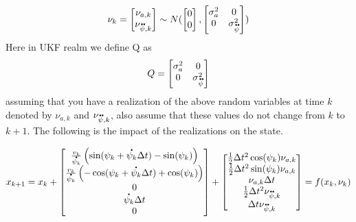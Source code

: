 \documentclass[a4paper,12pt]{article}
\newcommand*{\dt}[1]{%
  \accentset{\mbox{\large\bfseries .}}{#1}}
\newcommand*{\ddt}[1]{%
  \accentset{\mbox{\large\bfseries .\hspace{-0.25ex}.}}{#1}}
\begin{document}
   \begin{align}  
  \nu_{k}=
  		 \begin{bmatrix}
         \nu_{a,k}\\
         \nu_{\ddt{\psi},k}\\
         \end{bmatrix} 
         \sim N(
         \begin{bmatrix}
          0  \\
          0  \\
		 \end{bmatrix},     
         \begin{bmatrix}
    \sigma^2_a       & 0  \\
    0       & \sigma^{2}_{\ddt{\psi}}  \\
		\end{bmatrix} )
  \end{align} 
Here in UKF realm we define Q as 
   \begin{align}  
  Q =
    \begin{bmatrix}
    \sigma^2_a & 0  \\
    0  & \sigma^{2}_{\ddt{\psi}}  \\
	\end{bmatrix} 
  \end{align} 
assuming that you have a realization of the above random variables at time $k$ denoted by $\nu_{a,k}$ and $\nu_{\ddt{\psi},k}$, also assume that these values do not change from $k$ to $k+1$. The following is the impact of the realizations on the state. 

   \begin{align}  
  x_{k+1}=x_k + 
  		 \begin{bmatrix}
         \frac{v_k}{\dt{\psi_k}}\left(\sin(\psi_k+\dt{\psi_k} \Delta t) -\sin(\psi_k) \right)\\
         \frac{v_k}{\dt{\psi_k}}\left(-\cos(\psi_k+\dt{\psi_k} \Delta t) +\cos(\psi_k) \right)\\
         0 \\
         \dt{\psi_k}\Delta t \\
         0 \\
         \end{bmatrix} 
+
  		 \begin{bmatrix}
         \frac{1}{2}\Delta t^2\cos(\psi_k)\nu_{a,k}\\
         \frac{1}{2}\Delta t^2\sin(\psi_k)\nu_{a,k}\\
         \nu_{a,k}\Delta t\\
         \frac{1}{2}\Delta t^2\nu_{\ddt{\psi},k}\\
         \Delta t\nu_{\ddt{\psi},k}\\
         \end{bmatrix} = f(x_{k},\nu_k)
  \end{align} 
  
\end{document}
